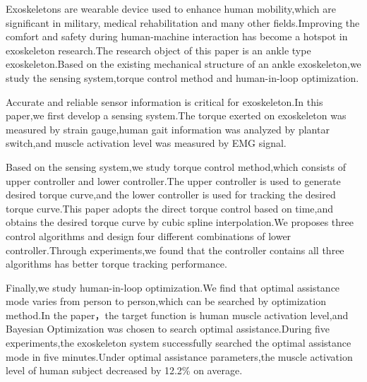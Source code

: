 \begin{abstractEn}
  Exoskeletons are wearable device used to enhance human mobility,which are significant in military, medical rehabilitation and many other fields.Improving the comfort and safety during human-machine interaction has become a hotspot in exoskeleton research.The research object of this paper is an ankle type exoskeleton.Based on the existing mechanical structure of an ankle exoskeleton,we study the sensing system,torque control method and human-in-loop optimization.

  Accurate and reliable sensor information is critical for exoskeleton.In this paper,we first develop a sensing system.The torque exerted on exoskeleton was measured by strain gauge,human gait information was analyzed by plantar switch,and muscle activation level was measured by EMG signal.

  Based on the sensing system,we study torque control method,which consists of upper controller and lower controller.The upper controller is used to generate desired torque curve,and the lower controller is used for tracking the desired torque curve.This paper adopts the direct torque control based on time,and obtains the desired torque curve by cubic spline interpolation.We proposes three control algorithms and design four different combinations of lower controller.Through experiments,we found that the controller contains all three algorithms has better torque tracking performance.

  Finally,we study human-in-loop optimization.We find that optimal assistance mode varies from person to person,which can be searched by optimization method.In the paper，the target function is human muscle activation level,and Bayesian Optimization was chosen to search optimal assistance.During five experiments,the exoskeleton system successfully searched the optimal assistance mode in five minutes.Under optimal assistance parameters,the muscle activation level of human subject decreased by 12.2\% on average.
\end{abstractEn}


\usepackage{subfig}
\usepackage{rotating}
\usepackage[usenames,dvipsnames]{xcolor}
\usepackage{tikz}
\usepackage{pgfplots}
\pgfplotsset{compat=1.16}
\usepackage{ifthen}
\usepackage{longtable}
\usepackage{siunitx}
\usepackage{listings}
\usepackage{multirow}
\usepackage[bottom]{footmisc}
\usepackage{pifont}

